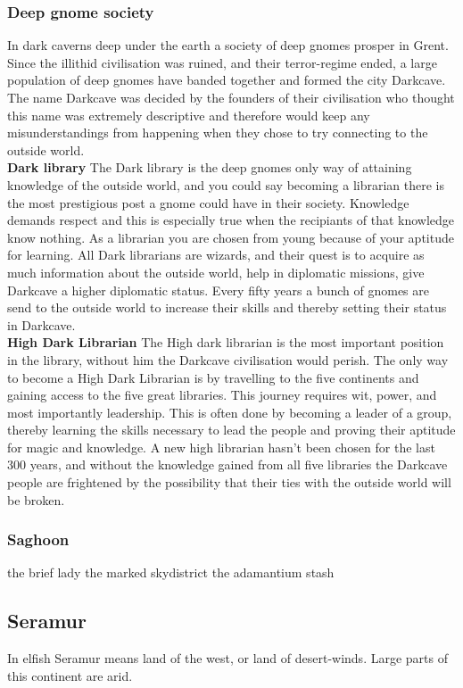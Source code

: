 \documentclass[a4paper]{article}
\begin{document}
\subsubsection{Deep gnome society}
In dark caverns deep under the earth a society of deep gnomes prosper in Grent. Since the illithid civilisation was ruined, and their terror-regime ended, a large population of deep gnomes have banded together and formed the city Darkcave. The name Darkcave was decided by the founders of their civilisation who thought this name was extremely descriptive and therefore would keep any misunderstandings from happening when they chose to try connecting to the outside world.
\\
\textbf{Dark library}
The Dark library is the deep gnomes only way of attaining knowledge of the outside world, and you could say becoming a librarian there is the most prestigious post a gnome could have in their society. Knowledge demands respect and this is especially true when the recipiants of that knowledge know nothing. As a librarian you are chosen from young because of your aptitude for learning. All Dark librarians are wizards, and their quest is to acquire as much information about the outside world, help in diplomatic missions, give Darkcave a higher diplomatic status. Every fifty years a bunch of gnomes are send to the outside world to increase their skills and thereby setting their status in Darkcave.
\\
\textbf{High Dark Librarian} 
The High dark librarian is the most important position in the library, without him the Darkcave civilisation would perish. The only way to become a High Dark Librarian is by travelling to the five continents and gaining access to the five great libraries. This journey requires wit, power, and most importantly leadership. This is often done by becoming a leader of a group, thereby learning the skills necessary to lead the people and proving their aptitude for magic and knowledge. A new high librarian hasn't been chosen for the last 300 years, and without the knowledge gained from all five libraries the Darkcave people are frightened by the possibility that their ties with the outside world will be broken.


\subsubsection{Saghoon}
the brief lady
the marked
skydistrict
the adamantium stash

\subsection{Seramur}
In elfish Seramur means land of the west, or land of desert-winds. Large parts of this continent are arid.
\end{document}
